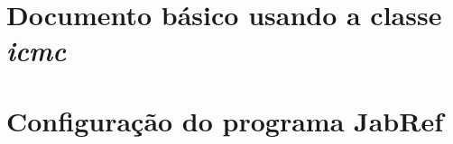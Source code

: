 \documentclass[qualificacao, pre-defesa]{packages/icmc}
\begin{document}




\begin{apendicesenv}

    \chapter{Documento básico usando a classe \textit{icmc}}
    \label{chapter:documento-basico}
    

    \chapter{Configuração do programa JabRef}
    \label{chapter:configuracao-jabref}
    

\end{apendicesenv}



\glsaddall
\printglossaries
\end{document}
